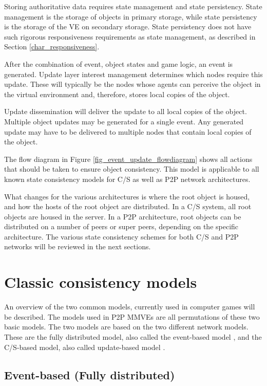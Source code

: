Storing authoritative data requires state management and state persistency. State management is the storage of objects in primary storage, while state persistency is the storage of the VE on secondary storage. State persistency does not have such rigorous responsiveness requirements as state management, as described in Section \ref{char_responsiveness}.

After the combination of event, object states and game logic, an event is generated. Update layer interest management determines which nodes require this update. These will typically be the nodes whose agents can perceive the object in the virtual environment and, therefore, stores local copies of the object.

Update dissemination will deliver the update to all local copies of the object. Multiple object updates may be generated for a single event. Any generated update may have to be delivered to multiple nodes that contain local copies of the object.

The flow diagram in Figure \ref{fig_event_update_flowdiagram} shows all actions that should be taken to ensure object consistency. This model is applicable to all known state consistency models for C/S as well as P2P network architectures.

What changes for the various architectures is where the root object is housed, and how the hosts of the root object are distributed. In a C/S system, all root objects are housed in the server. In a P2P architecture, root objects can be distributed on a number of peers or super peers, depending on the specific architecture. The various state consistency schemes for both C/S and P2P networks will be reviewed in the next sections.

\section{Classic consistency models}
\label{classic_models}

An overview of the two common models, currently used in computer games will be described. The models used in P2P MMVEs are all permutations of these two basic models. The two models are based on the two different network models. These are the fully distributed model, also called the event-based model \cite{p2p_cm_aoe}, and the C/S-based model, also called update-based model
\cite{unreal_networking}.

\subsection{Event-based (Fully distributed)}
\label{classic_event_based}

